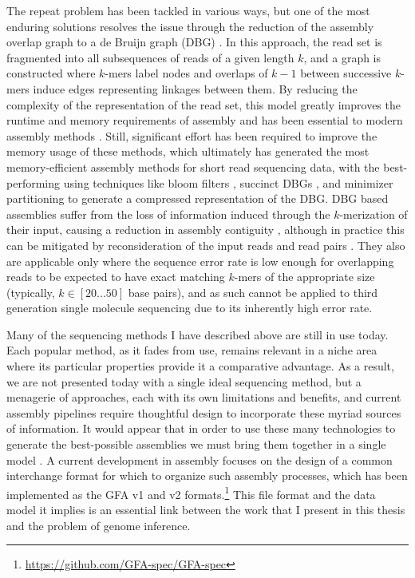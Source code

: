 The repeat problem has been tackled in various ways, but one of the most enduring solutions resolves the issue through the reduction of the assembly overlap graph to a de Bruijn graph (DBG) \cite{pevzner2001eulerian}.
In this approach, the read set is fragmented into all subsequences of reads of a given length $k$, and a graph is constructed where $k$-mers label nodes and overlaps of $k-1$ between successive $k$-mers induce edges representing linkages between them.
By reducing the complexity of the representation of the read set, this model greatly improves the runtime and memory requirements of assembly and has been essential to modern assembly methods \cite{zerbino2008velvet,simpson2009abyss,iqbal2012novo}.
Still, significant effort has been required to improve the memory usage of these methods, which ultimately has generated the most memory-efficient assembly methods for short read sequencing data, with the best-performing using techniques like bloom filters \cite{chikhi2013space}, succinct DBGs \cite{bowe2012succinct,li2015megahit}, and minimizer partitioning \cite{chikhi2016compacting} to generate a compressed representation of the DBG.
DBG based assemblies suffer from the loss of information induced through the $k$-merization of their input, causing a reduction in assembly contiguity \cite{earl2011assemblathon}, although in practice this can be mitigated by reconsideration of the input reads and read pairs \cite{butler2008allpaths}.
They also are applicable only where the sequence error rate is low enough for overlapping reads to be expected to have exact matching $k$-mers of the appropriate size (typically, $k \in [20 \ldots 50]$ base pairs), and as such cannot be applied to third generation single molecule sequencing due to its inherently high error rate.

Many of the sequencing methods I have described above are still in use today.
Each popular method, as it fades from use, remains relevant in a niche area where its particular properties provide it a comparative advantage.
As a result, we are not presented today with a single ideal sequencing method, but a menagerie of approaches, each with its own limitations and benefits, and current assembly pipelines require thoughtful design to incorporate these myriad sources of information.
It would appear that in order to use these many technologies to generate the best-possible assemblies we must bring them together in a single model \cite{chaisson2018multi}.
A current development in assembly focuses on the design of a common interchange format for which to organize such assembly processes, which has been implemented as the GFA v1 and v2 formats.\footnote{\url{https://github.com/GFA-spec/GFA-spec}}
This file format and the data model it implies is an essential link between the work that I present in this thesis and the problem of genome inference.

